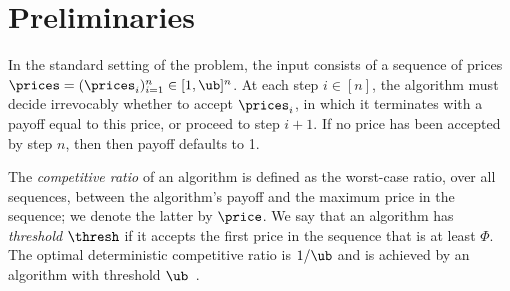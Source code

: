 \section{Preliminaries}
\label{sec:preliminaries}

In the standard setting of the \OMS{} problem, the input consists of a sequence of prices
$\prices=(\prices_i)_{i=1}^n \in [1,\ub]^n$. At each step $i \in [n]$, the algorithm must decide irrevocably  whether to accept $\prices_i$, in which it terminates with a payoff equal to this price, or proceed 
to step $i+1$. If no price has been accepted by step $n$, then then payoff defaults to 1. 

The {\em competitive ratio} of an algorithm is defined as the worst-case ratio, over all sequences, between the algorithm's payoff and the maximum price in the sequence; we denote the latter by $\price$. We say that an algorithm has {\em threshold} $\thresh$ if it accepts the first price in the sequence that is at least $\Phi$. The optimal deterministic competitive ratio is $1/\ub$ and is achieved by an algorithm with threshold $\ub$~\cite{el-yaniv_competitive_1998}.

